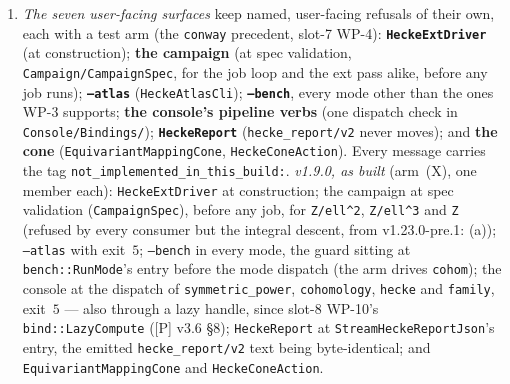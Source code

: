 \documentclass[11pt]{article}
\theoremstyle{remark}
\begin{document}
\begin{enumerate}[label=(b\arabic*)]
  nothing there'' to the operators it names, $\Theta^{s}_g$, the canonical $\Theta_g$ and
  $\Theta_{\mathrm{Iso},g}$, and points to that observation.)\par\endgroup
\item \emph{The seven user-facing surfaces} keep named, user-facing refusals of their own, each
  with a test arm (the \texttt{conway} precedent, slot-7 WP-4): \textbf{\texttt{HeckeExtDriver}}
  (at construction); \textbf{the campaign} (at spec validation, \texttt{Campaign/CampaignSpec}, for
  the job loop and the ext pass alike, before any job runs); \textbf{\texttt{--atlas}}
  (\texttt{HeckeAtlasCli}); \textbf{\texttt{--bench}}, every mode other than the ones WP-3
  supports; \textbf{the console's pipeline verbs} (one dispatch check in
  \texttt{Console/Bindings/}); \textbf{\texttt{HeckeReport}} (\texttt{hecke\_report/v2} never
  moves); and \textbf{the cone} (\texttt{EquivariantMappingCone}, \texttt{HeckeConeAction}).
  Every message carries the tag \texttt{not\_implemented\_in\_this\_build:}.
  \emph{v1.9.0, as built} (arm~(X), one member each): \texttt{HeckeExtDriver} at construction;
  the campaign at spec validation (\texttt{CampaignSpec}), before any job, for
  \texttt{Z/ell\textasciicircum2}, \texttt{Z/ell\textasciicircum3} and \texttt{Z} (refused by every consumer but the integral descent, from v1.23.0-pre.1: (a));
  \texttt{--atlas} with exit~$5$; \texttt{--bench} in every mode, the guard sitting at
  \texttt{bench::RunMode}'s entry before the mode dispatch (the arm drives \texttt{cohom}); the console at the dispatch of \texttt{symmetric\_power},
  \texttt{cohomology}, \texttt{hecke} and \texttt{family}, exit~$5$ --- also through a lazy handle,
  since slot-8 WP-10's \texttt{bind::LazyCompute} ([P] v3.6 \S8); \texttt{HeckeReport} at
  \texttt{StreamHeckeReportJson}'s entry, the emitted \texttt{hecke\_report/v2} text being
  byte-identical; and \texttt{EquivariantMappingCone} and \texttt{HeckeConeAction}.


\end{enumerate}
\end{document}
